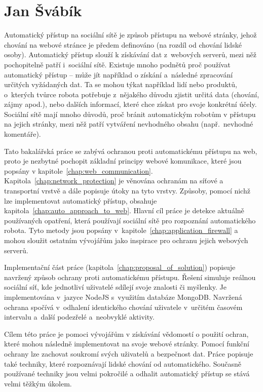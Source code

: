 \chapter{Jan Švábík}

Automatický přístup na sociální sítě je způsob přístupu na webové stránky, jehož chování na webové stránce je předem definováno (na rozdíl od chování lidské osoby). Automatický přístup slouží k získávání dat z~webových serverů, mezi něž pochopitelně patří i~sociální sítě. Existuje mnoho podnětů proč používat automatický přístup -- může jít například o získání a~následné zpracování určitých vyžádaných dat. Ta se mohou týkat například lidí nebo produktů, o~kterých tvůrce robota potřebuje z~nějakého důvodu zjistit určitá data (chování, zájmy apod.), nebo dalších informací, které chce získat pro svoje konkrétní účely. Sociální sítě mají mnoho důvodů, proč bránit automatickým robotům v přístupu na jejich stránky, mezi něž patří vytváření nevhodného obsahu (např.~nevhodné komentáře).

Tato bakalářská práce se zabývá ochranou proti automatickému přístupu na web, proto je nezbytné pochopit základní principy webové komunikace, které jsou popsány v kapitole~\ref{chap:web_communication}. Kapitola~\ref{chap:network_protection} je věnována ochranám na síťové a transportní vrstvě a dále popisuje útoky na tyto vrstvy. Způsoby, pomocí nichž lze implementovat automatický přístup, obsahuje kapitola~\ref{chap:auto_approach_to_web}. Hlavní cíl práce je detekce aktuálně používaných opatření, která používají sociální sítě pro rozpoznání automatického robota. Tyto metody jsou popsány v~kapitole~\ref{chap:application_firewall} a mohou sloužit ostatním vývojářům jako inspirace pro ochranu jejich webových serverů. 

Implementační část práce (kapitola~\ref{chap:proposal_of_solution}) popisuje navržený způsob ochrany proti automatickému přístupu. Řešení simuluje reálnou sociální síť, kde jednotliví uživatelé sdílejí svoje znalosti či myšlenky. Je implementována v~jazyce NodeJS s~využitím databáze MongoDB. Navržená ochrana spočívá v~odhalení identického chování uživatele v~určitém časovém intervalu a~další podezřelé a~neobvyklé aktivity. 

Cílem této práce je pomoci vývojářům v získávání vědomostí o použití ochran, které mohou následně implementovat na svoje webové stránky. Pomocí funkční ochrany lze zachovat soukromí svých uživatelů a bezpečnost dat. Práce popisuje také techniky, které rozpoznávají lidské chování od automatického. Současně používané techniky jsou velmi pokročilé a odhalit automatický přístup se stává velmi těžkým úkolem.

